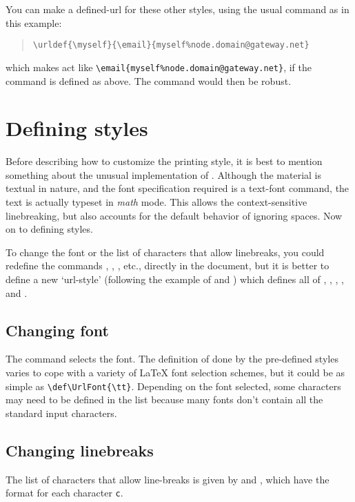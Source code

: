 \documentclass[a4paper]{article}
\begin{document}
You can make a defined-url for these other styles, using the usual
 command as in this example:
\begin{quote}
\begin{verbatim}
\urldef{\myself}{\email}{myself%node.domain@gateway.net}
\end{verbatim}
\end{quote}
which makes  act like
\verb+\email{myself%node.domain@gateway.net}+,
if the  command is defined as above.  The 
command would then be robust.

\section{Defining styles}

Before describing how to customize the printing style, it is best to
mention something about the unusual implementation of .  Although
the material is textual in nature, and the font specification required
is a text-font command, the text is actually typeset in \emph{math} mode.
This allows the context-sensitive linebreaking, but also accounts for
the default behavior of ignoring spaces.  Now on to defining styles.

To change the font or the list of characters that allow linebreaks, you
could redefine the commands , ,
, etc., directly in the document, but it is better to
define a new `url-style' (following the example of 
and ) which defines all of ,
, , , and .

\subsection{Changing font}
The  command selects the font.  The definition of
 done by the pre-defined styles varies to cope with a
variety of \LaTeX{} font selection schemes, but it could be as simple
as \verb+\def\UrlFont{\tt}+.  Depending on the font selected, some
characters may need to be defined in the  list because
many fonts don't contain all the standard input characters.

\subsection{Changing linebreaks}
The list of characters that allow line-breaks is given by
 and \hspace{1in}\hspace{-1in}
, which have the format
 for each character \texttt{c}.
\end{document}

